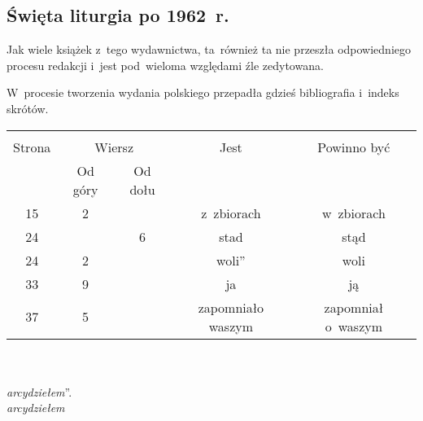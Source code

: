 \documentclass[a4paper,11pt]{article}
\begin{document}
\vspace{\spaceTwo}



\subsection{Święta liturgia po 1962~r.}

\vspace{\spaceThree}






\start Jak wiele książek z~tego wydawnictwa, ta~również ta nie
przeszła odpowiedniego procesu redakcji i~jest pod~wieloma względami
źle zedytowana.

\vspace{\spaceFour}


\start W~procesie tworzenia wydania polskiego przepadła gdzieś
bibliografia i~indeks skrótów.

\begin{center}
  \begin{tabular}{|c|c|c|c|c|}
    \hline
    & \multicolumn{2}{c|}{} & & \\
    Strona & \multicolumn{2}{c|}{Wiersz} & Jest
                              & Powinno być \\ \cline{2-3}
    & Od góry & Od dołu & & \\
    \hline
    15  &  2 & & z~zbiorach & w~zbiorach \\
    24  & &  6 & stad & stąd \\
    24  &  2 & & woli'' & woli \\
    33  &  9 & & ja & ją \\
    37  &  5 & & zapomniało waszym & zapomniał o~waszym \\
    \hline
  \end{tabular}
\end{center}
\noindent\\
 \\
\Jest  \emph{arcydziełem}''. \\
\Powin \emph{arcydziełem} \\
\end{document}
